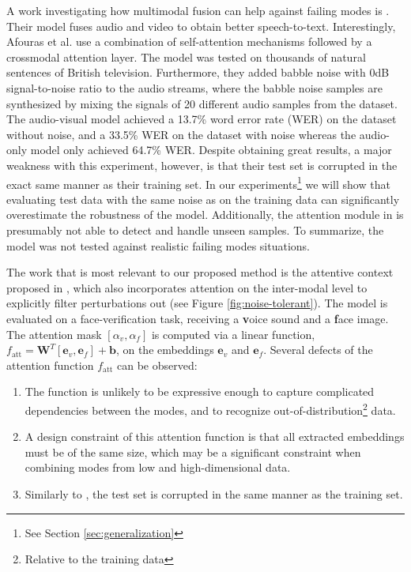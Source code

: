 A work investigating how multimodal fusion can help against failing modes is \citep{afouras}. Their model fuses audio and video to obtain better speech-to-text. Interestingly, Afouras et al. use a combination of self-attention mechanisms followed by a crossmodal attention layer. The model was tested on thousands of natural sentences of British television. Furthermore, they added babble noise with 0dB signal-to-noise ratio to the audio streams, where the babble noise samples are synthesized by mixing the signals of 20 different audio samples from the dataset. The audio-visual model achieved a 13.7\% word error rate (WER) on the dataset without noise, and a 33.5\% WER on the dataset with noise whereas the audio-only model only achieved 64.7\% WER. Despite obtaining great results, a major weakness with this experiment, however, is that their test set is corrupted in the exact same manner as their training set. In our experiments\footnote{See Section \ref{sec:generalization}} we will show that evaluating test data with the same noise as on the training data can significantly overestimate the robustness of the model. Additionally, the attention module in \citep{afouras} is presumably not able to detect and handle unseen samples. To summarize, the model was not tested against realistic failing modes situations.

The work that is most relevant to our proposed method is the attentive context proposed in \citep{audiovisual-attention}, which also incorporates attention on the inter-modal level to explicitly filter perturbations out (see Figure \ref{fig:noise-tolerant}). The model is evaluated on a face-verification task, receiving a \textbf{v}oice sound and a \textbf{f}ace image. The attention mask $[\alpha_v,\alpha_f]$ is computed via a linear function, $f_{\text{att}} = \mathbf{W}^T[\mathbf{e}_v, \mathbf{e}_f] + \mathbf{b}$, on the embeddings $\mathbf{e}_v$ and $\mathbf{e}_f$. Several defects of the attention function $f_{\text{att}}$ can be observed: 
\begin{enumerate}
\item The function is unlikely to be expressive enough to capture complicated dependencies between the modes, and to recognize out-of-distribution\footnote{Relative to the training data} data.
\item A design constraint of this attention function is that all extracted embeddings must be of the same size, which may be a significant constraint when combining modes from low and high-dimensional data.
\item Similarly to \citep{afouras}, the test set is corrupted in the same manner as the training set.
\end{enumerate}

